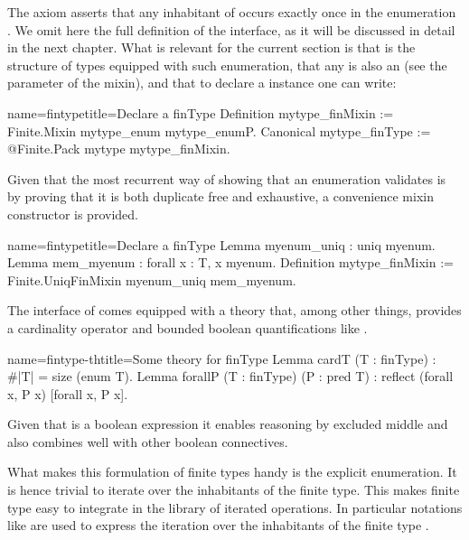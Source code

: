 The axiom asserts that any inhabitant of  occurs exactly once
in the enumeration .  We omit here the full definition of the
interface, as it will be discussed in detail in the next chapter.
What is relevant for the current section is that  is the
structure of types equipped with such enumeration, that any 
is also an  (see the parameter of the mixin), and that
to declare a  instance one can write:

\begin{coq}{name=fintype}{title=Declare a finType}
Definition mytype_finMixin := Finite.Mixin mytype_enum mytype_enumP.
Canonical mytype_finType := @Finite.Pack mytype mytype_finMixin.
\end{coq}

Given that the most recurrent way of showing that an enumeration
validates  is by proving that it is both duplicate free
and exhaustive, a convenience mixin constructor is provided.

\begin{coq}{name=fintype}{title=Declare a finType}
Lemma myenum_uniq : uniq myenum.
Lemma mem_myenum : forall x : T, x \in myenum.
Definition mytype_finMixin := Finite.UniqFinMixin myenum_uniq mem_myenum.
\end{coq}

The interface of  comes equipped with a theory that, among
other things, provides a cardinality operator  and bounded
boolean quantifications like \C{[forall x, P]}.

\begin{coq}{name=fintype-th}{title=Some theory for finType}
Lemma cardT (T : finType) : #|T| = size (enum T).
Lemma forallP (T : finType) (P : pred T) : reflect (forall x, P x) [forall x, P x].
\end{coq}

Given that \C{[forall x, P x]} is a boolean expression
it enables reasoning by excluded middle and also combines well with
other boolean connectives.

What makes this formulation of finite types handy is the explicit
enumeration.  It is hence trivial to iterate over the inhabitants of the
finite type.  This makes finite type easy to integrate in the
library of iterated operations.  In particular notations like
 are used to express the iteration over the
inhabitants of the finite type .

